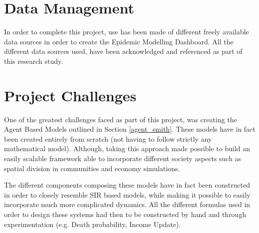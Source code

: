 \section{Data Management}
In order to complete this project, use has been made of different freely available data sources in order to create the Epidemic Modelling Dashboard. All the different data sources used, have been acknowledged and referenced as part of this research study. 

\section{Project Challenges}
One of the greatest challenges faced as part of this project, was creating the Agent Based Models outlined in Section \ref{agent_smith}. These models have in fact been created entirely from scratch (not having to follow strictly any mathematical model). Although, taking this approach made possible to build an easily scalable framework able to incorporate different society aspects such as spatial division in communities and economy simulations. 

The different components composing these models have in fact been constructed in order to closely resemble SIR based models, while making it possible to easily incorporate much more complicated dynamics. All the different formulas used in order to design these systems had then to be constructed by hand and through experimentation (e.g. Death probability, Income Update).